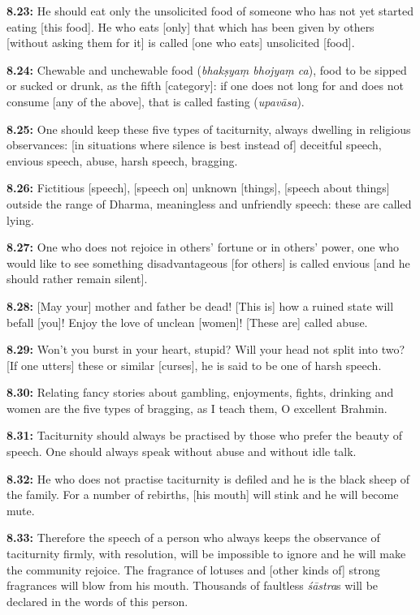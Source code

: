 \documentclass{article}
\newcommand{\vsnum}[1]{\textbf{#1}}
\newcommand{\skt}[1]{\textit{#1}}
\begin{document}
\vsnum{8.23: }He should eat only the unsolicited food of someone who has not yet started eating [this food]. He who eats [only] that which has been given by others [without asking them for it] is called [one who eats] unsolicited [food].

\vsnum{8.24: }Chewable and unchewable food (\skt{bhakṣyaṃ bhojyaṃ ca}), food to be sipped or sucked or drunk, as the fifth [category]: if one does not long for and does not consume [any of the above], that is called fasting (\skt{upavāsa}).

\vsnum{8.25: }One should keep these five types of taciturnity, always dwelling in religious observances: [in situations where silence is best instead of] deceitful speech, envious speech, abuse, harsh speech, bragging.

\vsnum{8.26: }Fictitious [speech], [speech on] unknown [things], [speech about things] outside the range of Dharma, meaningless and unfriendly speech: these are called lying.

\vsnum{8.27: }One who does not rejoice in others' fortune or in others' power, one who would like to see something disadvantageous [for others] is called envious [and he should rather remain silent].

\vsnum{8.28: }[May your] mother and father be dead! [This is] how a ruined state will befall [you]! Enjoy the love of unclean [women]! [These are] called abuse.

\vsnum{8.29: }Won't you burst in your heart, stupid? Will your head not split into two? [If one utters] these or similar [curses], he is said to be one of harsh speech.

\vsnum{8.30: }Relating fancy stories about gambling, enjoyments, fights, drinking and women are the five types of bragging, as I teach them, O excellent Brahmin.

\vsnum{8.31: }Taciturnity should always be practised by those who prefer the beauty of speech. One should always speak without abuse and without idle talk.

\vsnum{8.32: }He who does not practise taciturnity is defiled and he is the black sheep of the family. For a number of rebirths, [his mouth] will stink and he will become mute.

\vsnum{8.33: }Therefore the speech of a person who always keeps the observance of taciturnity firmly, with resolution, will be impossible to ignore and he will make the community rejoice. The fragrance of lotuses and [other kinds of] strong fragrances will blow from his mouth. Thousands of faultless \skt{śāstra}s will be declared in the words of this person.
\end{document}
